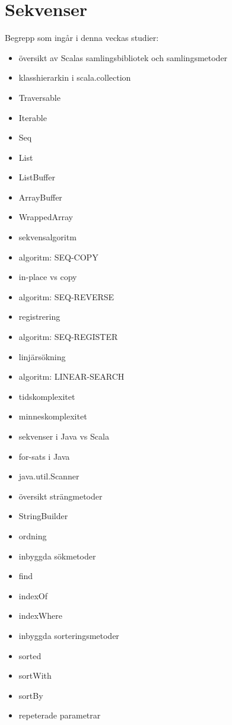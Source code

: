\chapter{Sekvenser}\label{chapter:W07}
Begrepp som ingår i denna veckas studier:
\begin{multicols}{2}\begin{itemize}[noitemsep,label={$\square$},leftmargin=*]
\item översikt av Scalas samlingsbibliotek och samlingsmetoder
\item klasshierarkin i scala.collection
\item Traversable
\item Iterable
\item Seq
\item List
\item ListBuffer
\item ArrayBuffer
\item WrappedArray
\item sekvensalgoritm
\item algoritm: SEQ-COPY
\item in-place vs copy
\item algoritm: SEQ-REVERSE
\item registrering
\item algoritm: SEQ-REGISTER
\item linjärsökning
\item algoritm: LINEAR-SEARCH
\item tidskomplexitet
\item minneskomplexitet
\item sekvenser i Java vs Scala
\item for-sats i Java
\item java.util.Scanner
\item översikt strängmetoder
\item StringBuilder
\item ordning
\item inbyggda sökmetoder
\item find
\item indexOf
\item indexWhere
\item inbyggda sorteringsmetoder
\item sorted
\item sortWith
\item sortBy
\item repeterade parametrar\end{itemize}\end{multicols}
